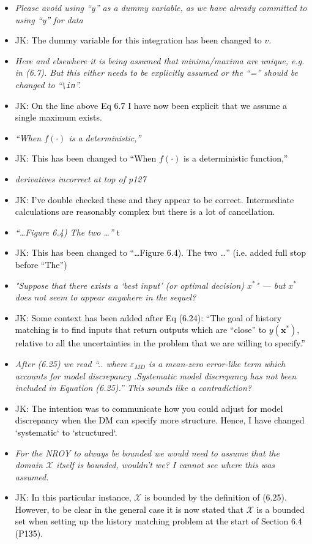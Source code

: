 \documentclass[12pt]{article}
\newcommand{\calX}{\mathcal{X}}
\newcommand{\bx}{\bm{x}}
\newcommand{\done}[2]{\item[#1]\textit{#2}}
\newcommand{\jack}[1]{\item{\textcolor{black}{JK: #1}}}
\begin{document}
\begin{itemize}
\done{P124}{Please avoid using ``y'' as a dummy variable, as we have already committed to using ``y'' for data}
\jack{The dummy variable for this integration has been changed to $v$.}

\done{P124}{ Here and elsewhere it is being assumed that minima/maxima are unique, e.g. in (6.7).  But this either needs to be explicitly assumed or the ``='' should be changed to ``\texttt{\textbackslash in}''.}

\jack{On the line above Eq 6.7 I have now been explicit that we assume a single maximum exists.}

\done{P124}{``When $f(\cdot)$ is a deterministic,''}

\jack{This has been changed to ``When $f(\cdot)$ is a deterministic function,''}

\done{P127}{derivatives incorrect at top of p127}

\jack{I've double checked these and they appear to be correct. Intermediate calculations are reasonably complex but there is a lot of cancellation.}

\done{P136}{``\ldots Figure 6.4) The two \ldots''}
t
\jack{This has been changed to ``\ldots Figure 6.4). The two \ldots'' (i.e. added full stop before ``The'')}
\done{P136}{"Suppose that there exists a ‘best input’ (or optimal decision) $x^*$" --- but $x^*$ does not seem to appear anywhere in the sequel?}

\jack{Some context has been added after Eq (6.24): ``The goal of history matching is to find inputs that return outputs which are ``close'' to $y(\bx^{*})$, relative to all the uncertainties in the problem that we are willing to specify.''}

\done{P137}{After (6.25) we read ``.. where $\varepsilon_{MD}$ is a mean-zero error-like term which accounts for model discrepancy .Systematic model discrepancy has not been included in Equation (6.25).''  This sounds like a contradiction?}

\jack{The intention was to communicate how you could adjust for model discrepancy when the DM can specify more structure. Hence, I have changed `systematic` to `structured`.}

\done{P139}{ For the NROY to always be bounded we would need to assume that the domain $\mathcal{X}$ itself is bounded, wouldn’t we?  I cannot see where this was assumed.}

\jack{In this particular instance, $\calX$ is bounded by the definition of (6.25). However, to be clear in the general case it is now stated that $\calX$ is a bounded set when setting up the history matching problem at the start of Section 6.4 (P135).}


\end{itemize}
\end{document}
